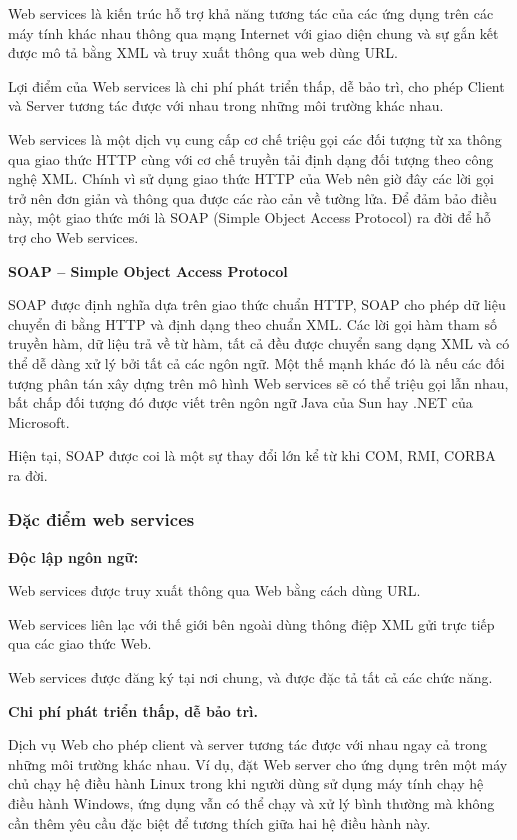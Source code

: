 Web services là kiến trúc hỗ trợ khả năng tương tác của các ứng dụng trên các máy tính khác nhau thông qua mạng Internet với giao diện chung và sự gắn kết được mô tả bằng XML và truy xuất thông qua web dùng URL.

Lợi điểm của Web services là chi phí phát triển thấp, dễ bảo trì, cho phép Client và Server tương tác được với nhau trong những môi trường khác nhau.

Web services là một dịch vụ cung cấp cơ chế triệu gọi các đối tượng từ xa thông qua giao thức HTTP cùng với cơ chế truyền tải định dạng đối tượng theo công nghệ XML. Chính vì sử dụng giao thức HTTP của Web nên giờ đây các lời gọi trở nên đơn giản và thông qua được các rào cản về tường lửa. Để đảm bảo điều này, một giao thức mới là SOAP (Simple Object Access Protocol) ra đời để hỗ trợ cho Web services.  

\textbf{SOAP – Simple Object Access Protocol}

SOAP được định nghĩa dựa trên giao thức chuẩn HTTP, SOAP cho phép dữ liệu chuyển đi bằng HTTP và định dạng theo chuẩn XML. Các lời gọi hàm tham số truyền hàm, dữ liệu trả về từ hàm, tất cả đều được chuyển sang dạng XML và có thể dễ dàng xử lý bởi tất cả các ngôn ngữ. Một thế mạnh khác đó là nếu các đối tượng phân tán xây dựng trên mô hình Web services sẽ có thể triệu gọi lẫn nhau, bất chấp đối tượng đó được viết trên ngôn ngữ Java của Sun hay .NET của Microsoft.
  
Hiện tại, SOAP được coi là một sự thay đổi lớn kể từ khi COM, RMI, CORBA ra đời.

\subsubsection{Đặc điểm web services}

\textbf{Độc lập ngôn ngữ:}

Web services được truy xuất thông qua Web bằng cách dùng URL.

Web services liên lạc với thế giới bên ngoài dùng thông điệp XML gửi trực tiếp qua các giao thức Web.

Web services được đăng ký tại nơi chung, và được đặc tả tất cả các chức năng.

\textbf{Chi phí phát triển thấp, dễ bảo trì.}

Dịch vụ Web cho phép client và server tương tác được với nhau ngay cả trong những môi trường khác nhau. Ví dụ, đặt Web server cho ứng dụng trên một máy chủ chạy hệ điều hành Linux trong khi người dùng sử dụng máy tính chạy hệ điều hành Windows, ứng dụng vẫn có thể chạy và xử lý bình thường mà không cần thêm yêu cầu đặc biệt để tương thích giữa hai hệ điều hành này.

